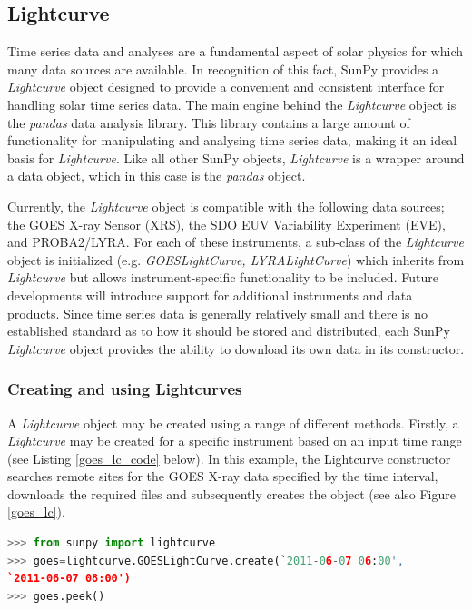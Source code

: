 \subsection{Lightcurve}
\lstset{frame=single}

Time series data and analyses are a fundamental aspect of solar physics for which many data sources are available. In recognition of this fact, SunPy provides a \textit{Lightcurve} object designed to provide a convenient and consistent interface for handling solar time series data. The main engine behind the \textit{Lightcurve} object is the \textit{pandas} data analysis library. This library contains a large amount of functionality for manipulating and analysing time series data, making it an ideal basis for \textit{Lightcurve}.  Like all other SunPy objects, \textit{Lightcurve} is a wrapper around a data object, which in this case is the \textit{pandas} object. 

Currently, the \textit{Lightcurve} object is compatible with the following data sources; the GOES X-ray Sensor (XRS), the SDO EUV Variability Experiment (EVE), and PROBA2/LYRA. For each of these instruments, a sub-class of the \textit{Lightcurve} object is initialized (e.g. \textit{GOESLightCurve, LYRALightCurve}) which inherits from \textit{Lightcurve} but allows instrument-specific functionality to be included. Future developments will introduce support for additional instruments and data products. 
Since time series data is generally relatively small and there is no established standard as to how it should be stored and distributed, each SunPy \textit{Lightcurve} object provides the ability to download its own data in its constructor.

\subsubsection{Creating and using Lightcurves}

A \textit{Lightcurve} object may be created using a range of different methods. Firstly, a \textit{Lightcurve} may be created for a specific instrument based on an input time range (see Listing \ref{goes_lc_code} below). In this example, the Lightcurve constructor searches remote sites for the GOES X-ray data specified by the time interval, downloads the required files and subsequently creates the object (see also Figure \ref{goes_lc}).

\begin{lstlisting}[language=Python,caption = Creating a GOES lightcurve using a time range.,label=goes_lc_code]
>>> from sunpy import lightcurve
>>> goes=lightcurve.GOESLightCurve.create(`2011-06-07 06:00',
`2011-06-07 08:00')
>>> goes.peek()

\end{lstlisting}

